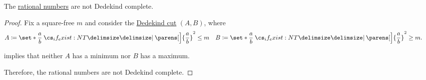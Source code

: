\begin{corollary}\label{thm:rational_numbers_not_dedekind_complete}
  The \hyperref[def:rational_numbers]{rational numbers} are not Dedekind complete.
\end{corollary}
\begin{proof}
  Fix a square-free \( m \) and consider the \hyperref[def:dedekind_cut]{Dedekind cut} \( (A, B) \), where
  \begin{align*}
    A \coloneqq \set*{ \frac a b \given* \parens[\Big]{ \frac a b }^2 \leq m }
    &&
    B \coloneqq \set*{ \frac a b \given* \parens[\Big]{ \frac a b }^2 \geq m }.
  \end{align*}

   implies that neither \( A \) has a minimum nor \( B \) has a maximum.

  Therefore, the rational numbers are not Dedekind complete.
\end{proof}
